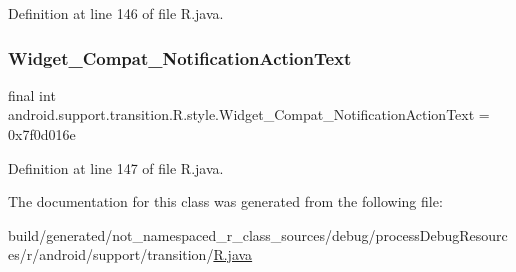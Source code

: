 Definition at line 146 of file R.\+java.

\mbox{\label{classandroid_1_1support_1_1transition_1_1_r_1_1style_af434cc5b5905a9b477e4ba7fb6c0ba54}} 
\subsubsection{\texorpdfstring{Widget\_Compat\_NotificationActionText}{Widget\_Compat\_NotificationActionText}}
{\footnotesize\ttfamily final int android.\+support.\+transition.\+R.\+style.\+Widget\+\_\+\+Compat\+\_\+\+Notification\+Action\+Text = 0x7f0d016e\hspace{0.3cm}{\ttfamily [static]}}



Definition at line 147 of file R.\+java.



The documentation for this class was generated from the following file\+:\begin{DoxyCompactItemize}
\item 
build/generated/not\+\_\+namespaced\+\_\+r\+\_\+class\+\_\+sources/debug/process\+Debug\+Resources/r/android/support/transition/\mbox{\hyperlink{android_2support_2transition_2_r_8java}{R.\+java}}\end{DoxyCompactItemize}
